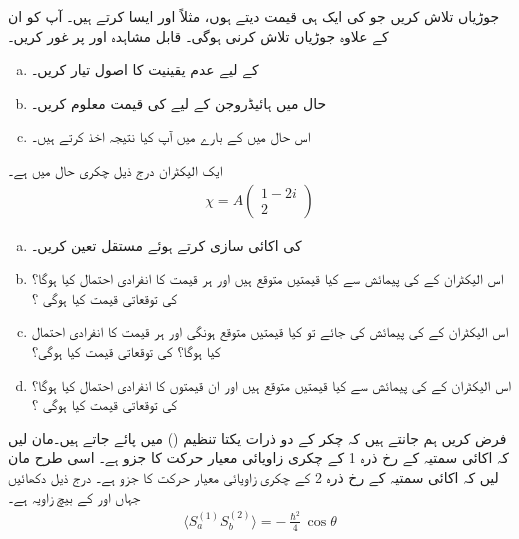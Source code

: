  جوڑیاں  تلاش کریں جو  کی ایک ہی قیمت دیتے ہوں، مثلاً  اور  ایسا کرتے ہیں۔ آپ کو ان کے علاوہ جوڑیاں تلاش کرنی ہوگی۔
قابل مشاہدہ  اور  پر غور کریں۔
\begin{enumerate}[a.]
\item
{} کے لیے عدم یقینیت کا اصول تیار کریں۔
\item
حال  میں ہائیڈروجن کے لیے  کی قیمت معلوم کریں۔
\item
اس حال میں  کے بارے میں آپ کیا نتیجہ اخذ کرتے ہیں۔
\end{enumerate}
ایک الیکٹران درج ذیل چکری حال میں ہے۔
\begin{align*}
\chi = A
\begin{pmatrix}
1 - 2i \\
2
\end{pmatrix}
\end{align*}
\begin{enumerate}[a.]
\item
{} کی اکائی سازی کرتے ہوئے مستقل  تعین کریں۔
\item
اس الیکٹران کے  کی پیمائش سے کیا قیمتیں متوقع ہیں اور ہر قیمت کا انفرادی احتمال کیا ہوگا؟  کی توقعاتی قیمت کیا ہوگی ؟
\item
 اس الیکٹران کے  کی پیمائش کی جائے تو کیا قیمتیں متوقع ہونگی اور ہر قیمت کا انفرادی احتمال کیا ہوگا؟  کی توقعاتی قیمت کیا ہوگی؟ 
\item
اس الیکٹران کے  کی پیمائش سے کیا قیمتیں متوقع ہیں اور ان قیمتوں کا انفرادی احتمال کیا ہوگا؟  کی توقعاتی قیمت کیا ہوگی ؟
\end{enumerate}
 
فرض کریں ہم جانتے ہیں کہ  چکر کے دو ذرات یکتا تنظیم () میں پائے جاتے ہیں۔مان لیں کہ اکائی سمتیہ  کے رخ ذرہ 1 کے چکری زاویائی معیار حرکت کا جزو ہے۔ اسی طرح مان لیں کہ اکائی سمتیہ  کے رخ ذرہ 2 کے چکری زاویائی معیار حرکت کا جزو  ہے۔ درج ذیل دکھائیں جہاں  اور  کے بیچ زاویہ  ہے۔
\begin{align}
 \langle S_{a}^{(1)}S_{b}^{(2)}\rangle=-\frac{\hslash^{2}}{4}\cos\theta
\end{align}

